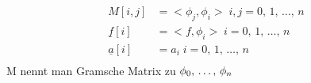 \begin{align*}
  M[i,j] &= <\phi_j, \phi_i>\; i,j = 0,\,1,\,\ldots,\,n\\
  \underline{f}[i] &= <f, \phi_i>\; i = 0,\,1,\,\ldots,\,n\\
  \underline{a}[i] &= a_i\; i = 0,\,1,\,\ldots,\,n\\
\end{align*}
M nennt man Gramsche Matrix zu $\phi_0,\,\ldots,\,\phi_n$
